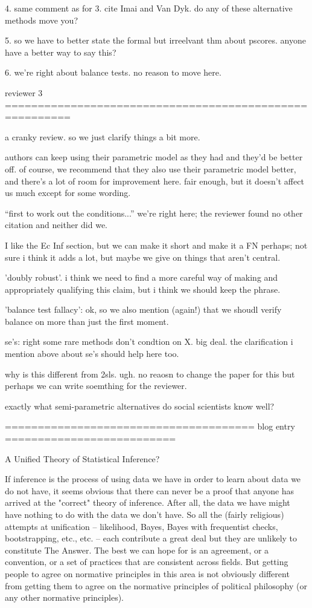 4.  same comment as for 3.  cite Imai and Van Dyk.  do any of these
alternative methods move you?

5. so we have to better state the formal but irreelvant thm about
pscores.  anyone have a better way to say this?

6.  we're right about balance tests.  no reason to move here.

reviewer 3 ========================================================

a cranky review.  so we just clarify things a bit more.

authors can keep using their parametric model as they had and they'd
be better off.  of course, we recommend that they also use their
parametric model better, and there's a lot of room for improvement
here.  fair enough, but it doesn't affect us much except for some
wording.

``first to work out the conditions...''  we're right here; the
reviewer found no other citation and neither did we.

I like the Ec Inf section, but we can make it short and make it a FN
perhaps; not sure i think it adds a lot, but maybe we give on things
that aren't central.

'doubly robust'.  i think we need to find a more careful way of making
and appropriately qualifying this claim, but i think we should keep
the phrase.
 
'balance test fallacy':  ok, so we also mention (again!) that we
shoudl verify balance on more than just the first moment.

se's:  right some rare methods don't condtion on X.  big deal.  the
clarification i mention above about se's should help here too.

why is this different from 2sls.  ugh.  no reaosn to change the paper
for this but perhaps we can write soemthing for the reviewer.

exactly what semi-parametric alternatives do social scientists know
well?


====================================== blog entry ==========================

A Unified Theory of Statistical Inference?

If inference is the process of using data we have in order to learn
about data we do not have, it seems obvious that there can never be a
proof that anyone has arrived at the "correct" theory of inference.
After all, the data we have might have nothing to do with the data we
don't have. So all the (fairly religious) attempts at unification --
likelihood, Bayes, Bayes with frequentist checks, bootstrapping, etc.,
etc. -- each contribute a great deal but they are unlikely to
constitute The Answer. The best we can hope for is an agreement, or a
convention, or a set of practices that are consistent across fields.
But getting people to agree on normative principles in this area is
not obviously different from getting them to agree on the normative
principles of political philosophy (or any other normative
principles).


